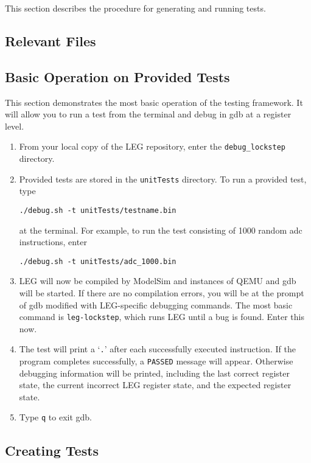 This section describes the procedure for generating and running tests. 

\subsection{Relevant Files}

\subsection{Basic Operation on Provided Tests}
This section demonstrates the most basic operation of the testing framework.
It will allow you to run a test from the terminal and debug in gdb at a register level.
\begin{enumerate}
\item From your local copy of the LEG repository, enter the \texttt{debug\_lockstep} directory.
\item Provided tests are stored in the \texttt{unitTests} directory. 
 To run a provided test, type 
 \begin{verbatim}./debug.sh -t unitTests/testname.bin\end{verbatim}
 at the terminal. For example, to run the test consisting of 1000 random adc instructions, enter 
 \begin{verbatim}./debug.sh -t unitTests/adc_1000.bin\end{verbatim}
\item LEG will now be compiled by ModelSim and instances of QEMU and gdb will be started.
 If there are no compilation errors, you will be at the prompt of gdb modified with LEG-specific debugging commands.
 The most basic command is \texttt{leg-lockstep}, which runs LEG until a bug is found.
 Enter this now.
\item The test will print a `\texttt{.}' after each successfully executed instruction.
 If the program completes successfully, a \texttt{PASSED} message will appear.
 Otherwise debugging information will be printed, including the last correct register state, the current incorrect LEG register state, and the expected register state.
\item Type \texttt{q} to exit gdb.
\end{enumerate}

\subsection{Creating Tests}

